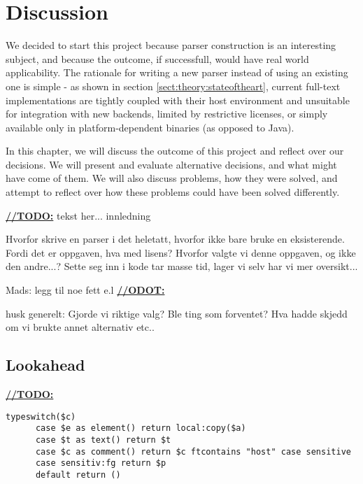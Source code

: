 \chapter{Discussion}
We decided to start this project because parser construction is an interesting
subject, and because the outcome, if successfull, would have real world
applicability. The rationale for writing a new parser instead of using an
existing one is simple - as shown in section \ref{sect:theory:stateoftheart},
current full-text implementations are tightly coupled with their
host environment and unsuitable for integration with new backends, limited by
restrictive licenses, or simply available only in platform-dependent binaries
(as opposed to Java). 

In this chapter, we will discuss the outcome of this project and reflect over
our decisions. We will present and evaluate alternative decisions, and what
might have come of them. We will also discuss problems, how they were
solved, and attempt to reflect over how these problems could have been solved
differently.

 \underline{\textbf{\LARGE //TODO:}} tekst her... innledning

Hvorfor skrive en parser i det heletatt, hvorfor ikke bare bruke en
eksisterende. Fordi det er oppgaven, hva med lisens? Hvorfor valgte vi denne
oppgaven, og ikke den andre...? Sette seg inn i kode tar masse tid, lager vi
selv har vi mer oversikt...

Mads: legg til noe fett e.l
\underline{\textbf{\LARGE //ODOT:}}

husk generelt: Gjorde vi riktige valg? Ble ting som forventet? Hva hadde skjedd
om vi brukte annet alternativ etc.. 

















\section{Lookahead}
\underline{\textbf{\LARGE //TODO:}}
\begin{verbatim}
typeswitch($c) 
      case $e as element() return local:copy($a)
      case $t as text() return $t
      case $c as comment() return $c ftcontains "host" case sensitive
      case sensitiv:fg return $p
      default return ()
\end{verbatim}

